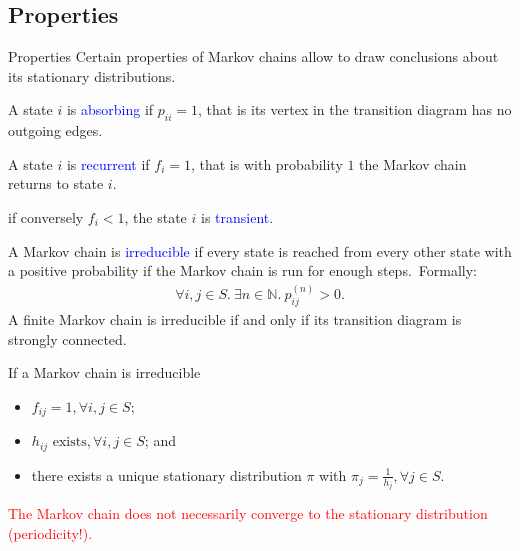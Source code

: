 \documentclass{beamer}
\def\padding{\vspace{0.5cm}}
\def\spadding{\vspace{0.25cm}}
\def\b{\textcolor{blue}}
\def\r{\textcolor{red}}
\begin{document}
\subsection{Properties}
\begin{frame}{Properties}
    Certain properties of Markov chains allow to draw conclusions about its stationary distributions.\pause\par\padding
    \begin{definition}
        A state $i$ is \b{absorbing} if $p_{ii} = 1$, that is its vertex in the transition diagram has no outgoing edges.\pause\par\spadding
        A state $i$ is \b{recurrent} if $f_{i} = 1$, that is with probability $1$ the Markov chain returns to state $i$.\pause\par
        if conversely $f_{i} < 1$, the state $i$ is \b{transient}.
    \end{definition}
\end{frame}

\begin{frame}
    \begin{definition}
        A Markov chain is \b{irreducible} if every state is reached from every other state with a positive probability if the Markov chain is run for enough steps.\pause\ Formally:
        \begin{align*}
            \forall i, j \in S.\ \exists n \in \mathbb{N}.\ p_{ij}^{(n)} > 0.
        \end{align*}\pause
        A finite Markov chain is irreducible if and only if its transition diagram is strongly connected.\pause\par\spadding
        If a Markov chain is irreducible\pause
        \begin{itemize}
            \item $f_{ij} = 1, \forall i, j \in S$\pause;
            \item $h_{ij} \text{ exists}, \forall i, j \in S$\pause; and
            \item there exists a unique stationary distribution $\pi$ with $\pi_j = \frac{1}{h_{j}}, \forall j \in S$.
        \end{itemize}\pause
        \r{The Markov chain does not necessarily converge to the stationary distribution (periodicity!).}
    \end{definition}
\end{frame}
\end{document}
